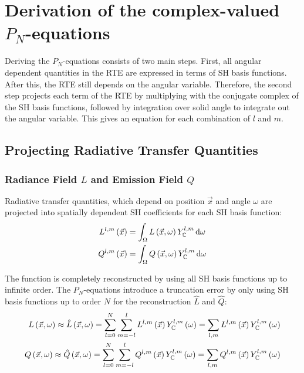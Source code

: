 \documentclass[10pt]{scrartcl}
\begin{document}
\section{Derivation of the complex-valued $P_N$-equations}

Deriving the $P_N$-equations consists of two main steps. First, all angular dependent quantities in the RTE are expressed in terms of SH basis functions. After this, the RTE still depends on the angular variable. Therefore, the second step projects each term of the RTE by multiplying with the conjugate complex of the SH basis functions, followed by integration over solid angle to integrate out the angular variable. This gives an equation for each combination of $l$ and $m$.

\subsection{Projecting Radiative Transfer Quantities}

\subsubsection{Radiance Field $L$ and Emission Field $Q$}
\label{sec:complex_proj_L}

Radiative transfer quantities, which depend on position $\vec{x}$ and angle $\omega$ are projected into spatially dependent SH coefficients for each SH basis function:
\begin{align}
L^{l,m}\left(\vec{x}\right)
&=
\int_\Omega{L\left(\vec{x}, \omega\right)Y_{\mathbb{C}}^{l,m}\,\mathrm{d}\omega}\nonumber\\
Q^{l,m}\left(\vec{x}\right)
&=
\int_\Omega{Q\left(\vec{x}, \omega\right)Y_{\mathbb{C}}^{l,m}\,\mathrm{d}\omega}\nonumber
\end{align} 

The function is completely reconstructed by using all SH basis functions up to infinite order. The $P_N$-equations introduce a truncation error by only using SH basis functions up to order $N$ for the reconstruction $\hat{L}$ and $\hat{Q}$:
\begin{align}
\label{eq:sh_exp_L}
L\left(\vec{x}, \omega\right)
\approx
\hat{L}\left(\vec{x}, \omega\right) =
\sum_{l=0}^{N}
{
\sum_{m=-l}^{l}
{
L^{l,m}\left(\vec{x}\right)Y_{\mathbb{C}}^{l,m}\left(\omega\right)
}
}
=
\sum_{l,m}
{
L^{l,m}\left(\vec{x}\right)Y_{\mathbb{C}}^{l,m}\left(\omega\right)
}\nonumber\\
Q\left(\vec{x}, \omega\right)
\approx
\hat{Q}\left(\vec{x}, \omega\right) =
\sum_{l=0}^{N}
{
\sum_{m=-l}^{l}
{
Q^{l,m}\left(\vec{x}\right)Y_{\mathbb{C}}^{l,m}\left(\omega\right)
}
}
=
\sum_{l,m}
{
Q^{l,m}\left(\vec{x}\right)Y_{\mathbb{C}}^{l,m}\left(\omega\right)
}
\end{align}
\end{document}
